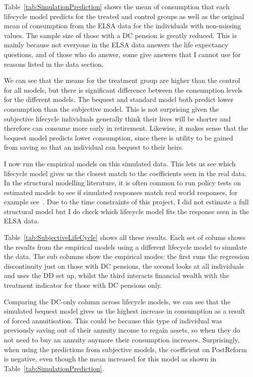\documentclass[12pt]{article}
\begin{document}


Table~\ref{tab:SimulationPrediction} shows the mean of consumption that each
lifecycle model predicts for the treated and control groups as well as the
original mean of consumption from the ELSA data for the individuals with
non-missing values. The sample size of those with a DC pension is greatly
reduced. This is mainly because not everyone in the ELSA data answers the life
expectancy questions, and of those who do answer, some give answers that I
cannot use for reasons listed in the data section.

We can see that the means for the treatment group are higher than the control
for all models, but there is significant difference between the consumption
levels for the different models. The bequest and standard model both predict
lower consumption than the subjective model. This is not surprising given the
subjective lifecycle individuals generally think their lives will be shorter and
therefore can consume more early in retirement. Likewise, it makes sense that
the bequest model predicts lower consumption, since there is utility to be
gained from saving so that an individual can bequest to their heirs.


I now run the empirical models on this simulated data. This lets us see which
lifecycle model gives us the closest match to the coefficients seen in the real
data. In the structural modelling literature, it is often common to run policy
tests on estimated models to see if simulated responses match real world
responses, for example see~\cite{mcgee-2021}. Due to the time constraints of
this project, I did not estimate a full structural model but I do check which
lifecycle model fits the response seen in the ELSA data.


\begin{landscape}
  \linespread{1.5}
  
\end{landscape}


Table~\ref{tab:SubjectiveLifeCycle} shows all these results. Each set of colums shows the
results from the empirical models using a different lifecycle model to simulate
the data. The sub columns show the empirical modes: the first runs the
regression discontinuity just on those with DC pensions, the second looks at
all individuals and uses the DD set up, whilst the third interacts financial
wealth with the treatment indicator for those with DC pensions only.

Comparing the DC-only column across lifecycle models, we can see that the
simulated bequest model gives us the highest increase in consumption as a result
of forced annuitisation. This could be because this type of individual was
previously saving out of their annuity income to regain assets, so when they do
not need to buy an annuity anymore their consumption increases. Surprisingly,
when using the predictions from subjective models, the coefficient on PostReform
is negative, even though the mean increased for this model as shown in Table~\ref{tab:SimulationPrediction}.
\end{document}
